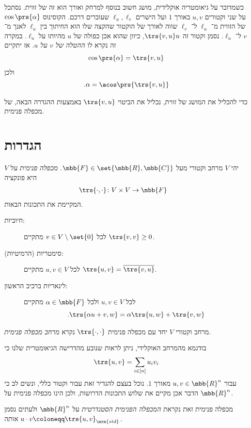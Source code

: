 \documentclass[a4paper,10pt,twoside,openany]{book}
\begin{document}
כשמדובר על גיאומטריה אוקלידית, מושג חשוב בנוסף למרחק ואורך הוא זה של זווית. נסתכל על שני וקטורים
$u,v$
באורך
$1$
ועל הישרים
$\ell_u, \ell_v$
שעוברים דרכם.
הקוסינוס
$\cos\prs{\alpha}$
של הזווית מ־%
$\ell_u$
ל־%
$\ell_v$
שווה לאורך של הוקטור שהקצה שלו הוא החיתוך בין
$\ell_u$
לאנך מ־%
$v$
ל־%
$\ell_u$.
נסמן וקטור זה
$\trs{v,u} u$,
כיוון שהוא אכן כפולה של
$u$
מהיותו על
$\ell_u$.
במקרה זה נקרא לו
\emph{ההטלה של
$v$
על
$u$}.
אז יתקיים
\[\cos\prs{\alpha} = \trs{v,u}\]
ולכן
\[\text{.} \alpha = \acos\prs{\trs{v,u}}\]

כדי להכליל את המושג של זווית, נכליל את הביטוי
$\trs{v,u}$
באמצעות ההגדרה הבאה, של מכפלה פנימית.

\section{הגדרות}

\begin{definition}
יהי
$V$
מרחב וקטורי מעל
$\mbb{F} \in \set{\mbb{R}, \mbb{C}}$.
\emph{מכפלה פנימית}
על
$V$
היא פונקציה
\begin{align*}
\trs{\cdot,\cdot} \colon V \times V &\to \mbb{F}
\end{align*}
המקיימת את התכונות הבאות.
\begin{description}
\item[חיוביות:]
לכל
$v \in V \setminus \set{0}$
מתקיים
$\trs{v,v} \geq 0$.

\item[סימטריות (הרמיטיות):]
לכל
$u,v \in V$
מתקיים
$\trs{u,v} = \overline{\trs{v,u}}$.

\item[לינאריות ברכיב הראשון:]
לכל
$u,v \in V$
ולכל
$\alpha \in \mbb{F}$
מתקיים
\[\text{.}\trs{\alpha u + v, w} = \alpha\trs{u,w} + \trs{v,w}\]
\end{description}

מרחב וקטורי
$V$
יחד עם מכפלה פנימית
$\trs{\cdot,\cdot}$
נקרא
\emph{מרחב מכפלה פנימית}.
\end{definition}

\begin{remark}
בודגמא מהמרחב האוקלידי, ניתן לראות שנובע מהדרישה הגיאומטרית שלנו כי
\[\trs{u,v} = \sum_{i \in [n]} u_i v_i\]
עבור
$u,v \in \mbb{R}^n$
מאורך
$1$.
נוכל בעצם להגדיר זאת עבור וקטור כללי, ונשים לב כי הדבר אכן מקיים את שלוש התכונות הדרושות, ולכן הינו מכפלה פנימית על
$\mbb{R}^n$.

מכפלה פנימית זאת נקראת
\emph{המכפלה הפנימית הסטנדרטית}
על
$\mbb{R}^n$
ולעתים נסמן אותה
$u \cdot v \coloneqq \trs{u,v}_{\mrm{std}}$.
\end{remark}
\end{document}
